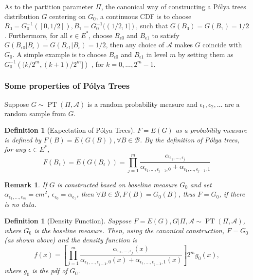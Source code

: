 \documentclass[12pt]{article}
\newtheorem{deff}[thm]{Definition}
\newtheorem{rmk}[thm]{Remark}
\newcommand{\polya}{P\'{o}lya}
\DeclareMathOperator{\pt}{PT}
\begin{document}
As to the partition parameter $\Pi$, the canonical way of constructing
a \polya{} trees distribution $G$ centering on $G_0$, a continuous CDF
is to choose $B_0 = G^{-1}_0 ([0, 1/2]), B_1 = G^{-1}_0 ((1/2,1])$,
such that $G(B_0) = G(B_1)= 1/2$. Furthermore, for all $\epsilon \in
E^{*}$, choose $B_{\epsilon 0 }$ and $B_{\epsilon 1}$ to satisfy 
$G(B_{\epsilon 0 } |B_{\epsilon} ) = G(B_{\epsilon 1} | B_{\epsilon})
= 1/2 $, then any choice of $\mathcal{A} $ makes $G$ coincide with
$G_0$. A simple example is to choose $B_{\epsilon 0} $ and
$B_{\epsilon 1}$ in level $m$ by setting them as $G^{-1}_0 \left(
  (k/2^m, (k+1)/2^m] \right)$ , for $k=0, \ldots, 2^m-1$. 

\subsubsection{Some properties of \polya{} Trees}
Suppose $G \sim \pt (\Pi, \mathcal{A})$ is a random probability
measure and $\epsilon_1, \epsilon_2, \ldots$ are a random sample from $G$. 

\begin{deff}[Expectation of \polya{} Trees]
$F= E(G)$ as a probability measure is defined by $F(B) = E(G(B)),
\forall B \in \mathcal{B}$. By the definition of \polya{} trees, for any
$\epsilon \in E^{*}$, 
\begin{displaymath}
F(B_{\epsilon})  = E(G(B_{\epsilon})) = \prod_{j=1}^m
\frac{\alpha_{\epsilon_1, \ldots, \epsilon_j}}{\alpha_{\epsilon_1,
    \ldots, \epsilon_{j-1},0} + \alpha_{\epsilon_1, \ldots, \epsilon_{j-1},1}}
\end{displaymath}
\end{deff}

\begin{rmk}
If $G$ is constructed based on baseline measure $G_0$ and set
$\alpha_{\epsilon_1, \ldots, \epsilon_m} = cm^2 $,
$\epsilon_{\epsilon_0 }= \alpha_{\epsilon_1}$, then $\forall B \in
\mathcal{B}, F(B) = G_0(B)$, thus $F=G_0$, if there is no
data.
\end{rmk}

\begin{deff}[Density Function]
Suppose $F=E(G), G|\Pi, \mathcal{A} \sim \pt (\Pi, \mathcal{A})$,
where $G_0 $ is the baseline measure. Then, using the canonical
construction, $F=G_0$ (as shown above) and the density function is 
\begin{equation}\label{eq:3}
f(x) = \left[ \prod_{j=1}^m \frac{ \alpha_{\epsilon_1, \ldots,
      \epsilon_j}(x)}{\alpha_{\epsilon_1, \ldots, \epsilon_{j-1},0}(x)
   + \alpha_{\epsilon_1, \ldots, \epsilon_{j-1},1}(x)} \right] 2^{m } g_0(x),
\end{equation}
where $g_0$ is the pdf of $G_0$. 
\end{deff}
\end{document}
